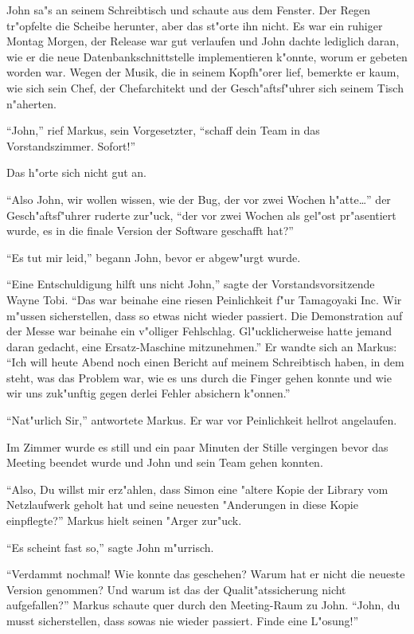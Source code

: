\begin{trenches}
John sa"s an seinem Schreibtisch und schaute aus dem Fenster. Der Regen tr"opfelte die Scheibe herunter, aber das st"orte ihn nicht. Es war ein ruhiger Montag
Morgen, der Release war gut verlaufen und John dachte lediglich daran, wie er die neue Datenbankschnittstelle implementieren k"onnte, worum er gebeten worden war.
Wegen der Musik, die in seinem Kopfh"orer lief, bemerkte er kaum, wie sich sein Chef, der Chefarchitekt und der Gesch"aftsf"uhrer sich seinem Tisch n"aherten. 

``John,'' rief Markus, sein Vorgesetzter, ``schaff dein Team in das Vorstandszimmer. Sofort!''

Das h"orte sich nicht gut an.
 
\thoughtbreak

``Also John, wir wollen wissen, wie der Bug, der vor zwei Wochen h"atte\ldots'' der Gesch"aftsf"uhrer ruderte zur"uck, ``der vor zwei Wochen als gel"ost
pr"asentiert wurde, es in die finale Version der Software geschafft hat?''

``Es tut mir leid,'' begann John, bevor er abgew"urgt wurde.

``Eine Entschuldigung hilft uns nicht John,'' sagte der Vorstandsvorsitzende Wayne Tobi. ``Das war beinahe eine riesen Peinlichkeit f"ur Tamagoyaki Inc. Wir m"ussen
sicherstellen, dass so etwas nicht wieder passiert. Die Demonstration auf der Messe war beinahe ein v"olliger Fehlschlag. Gl"ucklicherweise hatte jemand daran
gedacht, eine Ersatz-Maschine mitzunehmen.'' Er wandte sich an Markus: ``Ich will heute Abend noch einen Bericht auf meinem Schreibtisch haben, in dem steht, was
das Problem war, wie es uns durch die Finger gehen konnte und wie wir uns zuk"unftig gegen derlei Fehler absichern k"onnen.''

``Nat"urlich Sir,'' antwortete Markus. Er war vor Peinlichkeit hellrot angelaufen.

Im Zimmer wurde es still und ein paar Minuten der Stille vergingen bevor das Meeting beendet wurde und John und sein Team gehen konnten.

\thoughtbreak

``Also, Du willst mir erz"ahlen, dass Simon eine "altere Kopie der Library vom Netzlaufwerk geholt hat und seine neuesten "Anderungen in diese Kopie einpflegte?'' 
Markus hielt seinen "Arger zur"uck.

``Es scheint fast so,'' sagte John m"urrisch. 

``Verdammt nochmal! Wie konnte das geschehen? Warum hat er nicht die neueste Version genommen? Und warum ist das der Qualit"atssicherung nicht aufgefallen?'' Markus 
schaute quer durch den Meeting-Raum zu John. ``John, du musst sicherstellen, dass sowas nie wieder passiert. Finde eine L"osung!''
\end{trenches}

